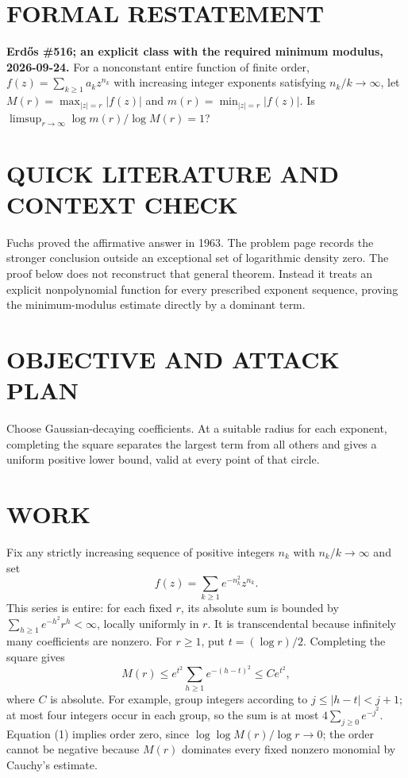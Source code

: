 \section{FORMAL RESTATEMENT}
\textbf{Erd\H{o}s \#516; an explicit class with the required minimum modulus, 2026-09-24.}
For a nonconstant entire function of finite order,
$f(z)=\sum_{k\geq1}a_kz^{n_k}$ with increasing integer exponents satisfying $n_k/k\to\infty$, let $M(r)=\max_{|z|=r}|f(z)|$ and $m(r)=\min_{|z|=r}|f(z)|$. Is $\limsup_{r\to\infty}\log m(r)/\log M(r)=1$?

\section{QUICK LITERATURE AND CONTEXT CHECK}
Fuchs proved the affirmative answer in 1963. The problem page records the stronger conclusion outside an exceptional set of logarithmic density zero. The proof below does not reconstruct that general theorem. Instead it treats an explicit nonpolynomial function for every prescribed exponent sequence, proving the minimum-modulus estimate directly by a dominant term.

\section{OBJECTIVE AND ATTACK PLAN}
Choose Gaussian-decaying coefficients. At a suitable radius for each exponent, completing the square separates the largest term from all others and gives a uniform positive lower bound, valid at every point of that circle.

\section{WORK}
Fix any strictly increasing sequence of positive integers $n_k$ with $n_k/k\to\infty$ and set
\[
 f(z)=\sum_{k\geq1}e^{-n_k^2}z^{n_k}.
\]
This series is entire: for each fixed $r$, its absolute sum is bounded by $\sum_{h\geq1}e^{-h^2}r^h<\infty$, locally uniformly in $r$. It is transcendental because infinitely many coefficients are nonzero.
For $r\geq1$, put $t=(\log r)/2$. Completing the square gives
\[
 M(r)\leq e^{t^2}\sum_{h\geq1}e^{-(h-t)^2}\leq C e^{t^2},       \tag{1}
\]
where $C$ is absolute. For example, group integers according to $j\leq|h-t|<j+1$; at most four integers occur in each group, so the sum is at most $4\sum_{j\geq0}e^{-j^2}$. Equation (1) implies order zero, since
$\log\log M(r)/\log r\to0$; the order cannot be negative because $M(r)$ dominates every fixed nonzero monomial by Cauchy's estimate.

